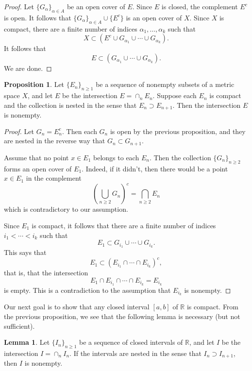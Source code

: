 \documentclass[12pt]{article}
\theoremstyle{definition}
\theoremstyle{theorem}
\newtheorem{proposition}[definition]{Proposition}
\newtheorem{lemma}[definition]{Lemma}
\begin{document}
\begin{proof}
Let $\{G_\alpha\}_{\alpha \in A}$ be an open cover of $E$. Since $E$ is closed, the complement $E^c$ is open. It follows that $\{G_\alpha\}_{\alpha \in A} \cup \{E^c\}$ is an open cover of $X$. Since $X$ is compact, there are a finite number of indices $\alpha_1, \ldots, \alpha_k$ such that 
\[
X \subset (E^c \cup G_{\alpha_1} \cup \cdots \cup G_{\alpha_k}).
\]
It follows that 
\[
E \subset (G_{\alpha_1} \cup \cdots \cup G_{\alpha_k}). 
\]
We are done. 
\end{proof}

\begin{proposition}\label{prop:nestedcompact}
Let $\{E_n\}_{n \geqslant 1}$ be a sequence of nonempty subsets of a metric space $X$, and let $E$ be the intersection $E = \cap_n E_n$. Suppose each $E_n$ is compact and the collection is nested in the sense that $E_n \supset E_{n+1}$. Then the intersection $E$ is nonempty. 
\end{proposition}

\begin{proof}
Let $G_n = E_n^c$. Then each $G_n$ is open by the previous proposition, and they are nested in the reverse way that $G_n \subset G_{n+1}$. 

Assume that no point $x \in E_1$ belongs to each $E_n$. Then the collection $\{G_n\}_{n \geqslant 2}$ forms an open cover of $E_1$. Indeed, if it didn't, then there would be a point $x \in E_1$ in the complement 
\[
\left(\bigcup_{n \geqslant 2} G_n\right)^c = \bigcap_{n \geqslant 2} E_n
\]
which is contradictory to our assumption. 


Since $E_1$ is compact, it follows that there are a finite number of indices $i_1 < \cdots < i_k$ such that 
\[
E_1 \subset G_{i_1} \cup \cdots \cup G_{i_k}. 
\]
This says that 
\[
E_1 \subset (E_{i_1} \cap \cdots \cap E_{i_k})^c,
\] 
that is, that the intersection 
\[
E_1 \cap E_{i_1} \cap \cdots \cap E_{i_k} = E_{i_k}
\]
is empty. This is a contradiction to the assumption that $E_{i_k}$ is nonempty. 
\end{proof}

Our next goal is to show that any closed interval $[a,b]$ of $\mathbb{R}$ is compact. From the previous proposition, we see that the following lemma is necessary (but not sufficient).  

\begin{lemma}
Let $\{I_n\}_{n \geqslant 1}$ be a sequence of closed intervals of $\mathbb{R}$, and let $I$ be the intersection $I = \cap_n I_n$. If the intervals are nested in the sense that $I_n \supset I_{n+1}$, then $I$ is nonempty. 
\end{lemma}
\end{document}
